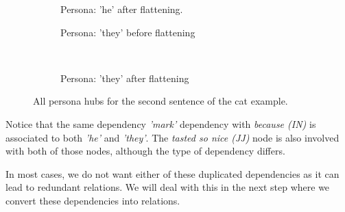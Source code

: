 \begin{figure}[H]
\begin{subfigure}[t]{0.9\textwidth}
\begin{tikzpicture}[->, node distance=3cm,main node/.style={circle, draw, font=\sffamily\bfseries}]
        \end{tikzpicture}
    \caption{Persona: 'he' after flattening.}
\end{subfigure}
\begin{subfigure}[t]{0.45\textwidth}
	\centering
    \caption{Persona: 'they' before flattening}
\end{subfigure}
~
\begin{subfigure}[t]{0.45\textwidth}
	\centering
    \caption{Persona: 'they' after flattening}
\end{subfigure}
\caption{All persona hubs for the second sentence of the cat example.}
\label{fig:second-hubs}
\end{figure}

Notice that the same dependency \textit{'mark'} dependency with \textit{because (IN)} is associated to both \textit{'he'} and \textit{'they'}. The \textit{tasted so nice (JJ)} node is also involved with both of those nodes, although the type of dependency differs.

In most cases, we do not want either of these duplicated dependencies as it can lead to redundant relations. We will deal with this in the next step where we convert these dependencies into relations.

